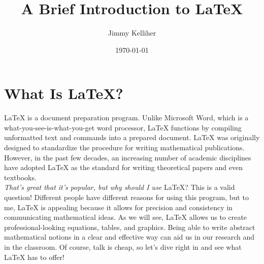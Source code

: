 \documentclass[12pt]{article}	%
\title{A Brief Introduction to \LaTeX}	%
\author{Jimmy Kelliher}			%
\date{\today}					%
\begin{document}

\maketitle 			%

\newpage			%

\tableofcontents	%


\newpage
\section{What Is \LaTeX{}?}

\LaTeX{} is a document preparation program. Unlike Microsoft Word, which is a what-you-see-is-what-you-get word processor, \LaTeX{} functions by compiling unformatted text and commands into a prepared document. \LaTeX{} was originally designed to standardize the procedure for writing mathematical publications. However, in the past few decades, an increasing number of academic disciplines have adopted \LaTeX{} as the standard for writing theoretical papers and even textbooks. \\

{\it That's great that it's popular, but why should I use} \LaTeX{}? This is a valid question! Different people have different reasons for using this program, but to me, \LaTeX{} is appealing because it allows for precision and consistency in communicating mathematical ideas. As we will see, \LaTeX{} allows us to create professional-looking equations, tables, and graphics. Being able to write abstract mathematical notions in a clear and effective way can aid us in our research and in the classroom. Of course, talk is cheap, so let's dive right in and see what \LaTeX{} has to offer!
\end{document}
